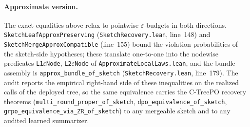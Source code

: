 \paragraph{Approximate version.}
The exact equalities above relax to pointwise $\varepsilon$-budgets in
both directions. \texttt{SketchLeafApproxPreserving}
(\texttt{SketchRecovery.lean}, line~148) and
\texttt{SketchMergeApproxCompatible} (line~155) bound the violation
probabilities of the sketch-side hypotheses; these translate one-to-one
into the nodewise predicates \texttt{L1$\varepsilon$Node},
\texttt{L2$\varepsilon$Node} of \texttt{ApproximateLocalLaws.lean}, and
the bundle assembly is \texttt{approx\_bundle\_of\_sketch}
(\texttt{SketchRecovery.lean}, line~179). The audit reports the
empirical right-hand side of these inequalities on the realized calls
of the deployed tree, so the same equivalence carries the C-TreePO
recovery theorems
(\texttt{multi\_round\_proper\_of\_sketch},
\texttt{dpo\_equivalence\_of\_sketch},
\texttt{grpo\_equivalence\_via\_ZR\_of\_sketch})
to any mergeable sketch and to any audited learned summarizer.
